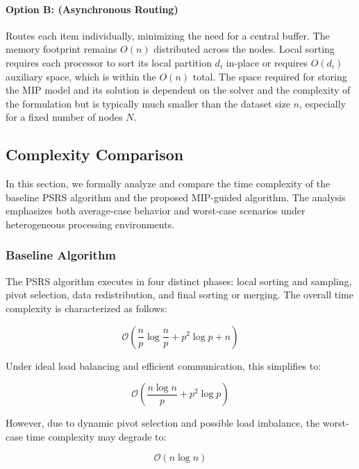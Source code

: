 \documentclass[]{interact}
\theoremstyle{plain}
\theoremstyle{definition}
\theoremstyle{remark}
\begin{document}
\paragraph{Option B: (Asynchronous Routing)} Routes each item individually, minimizing the need for a central buffer. The memory footprint remains $O(n)$ distributed across the nodes. Local sorting requires each processor to sort its local partition $d_i$ in-place or requires $O(d_i)$ auxiliary space, which is within the $O(n)$ total. The space required for storing the MIP model and its solution is dependent on the solver and the complexity of the formulation but is typically much smaller than the dataset size $n$, especially for a fixed number of nodes $N$.



\subsection{Complexity Comparison}


In this section, we formally analyze and compare the time complexity of the baseline PSRS algorithm and the proposed MIP-guided algorithm. The analysis emphasizes both average-case behavior and worst-case scenarios under heterogeneous processing environments.

\subsubsection{Baseline Algorithm}

The PSRS algorithm executes in four distinct phases: local sorting and sampling, pivot selection, data redistribution, and final sorting or merging. The overall time complexity is characterized as follows:

\begin{equation}
    \mathcal{O}\left(\frac{n}{p} \log \frac{n}{p} + p^2 \log p + n\right)
\end{equation}

Under ideal load balancing and efficient communication, this simplifies to:

\begin{equation}
    \mathcal{O}\left(\frac{n \log n}{p} + p^2 \log p\right)
\end{equation}

However, due to dynamic pivot selection and possible load imbalance, the worst-case time complexity may degrade to:

\begin{equation}
    \mathcal{O}(n \log n)
\end{equation}
\end{document}

